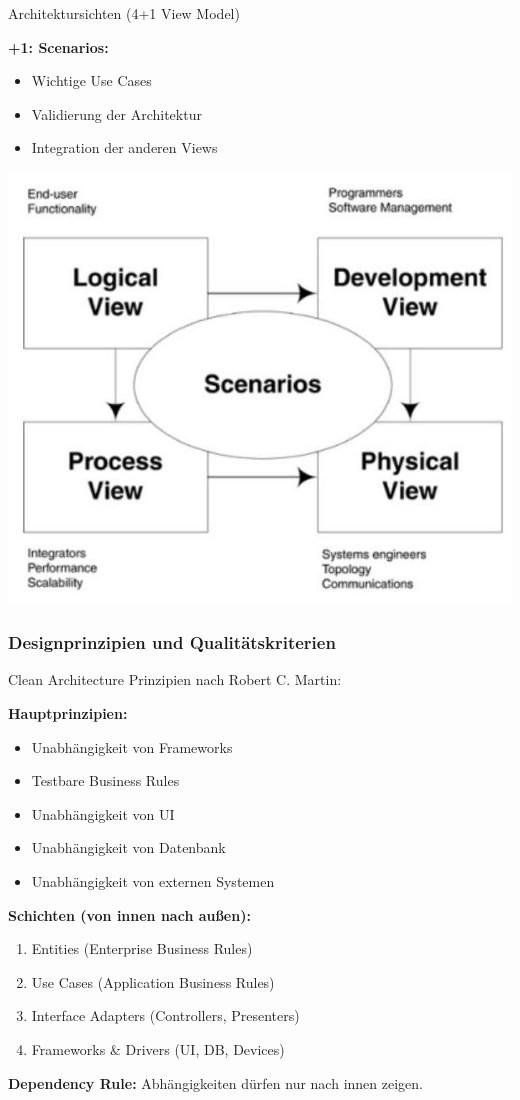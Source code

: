 \begin{concept}{Architektursichten (4+1 View Model)}
    
\textbf{+1: Scenarios:}
    \begin{itemize}
        \item Wichtige Use Cases
        \item Validierung der Architektur
        \item Integration der anderen Views
    \end{itemize}
\includegraphics[width=0.9\linewidth]{images/2024_12_29_0d1d7b5551ea1b4b41bdg-09}
\end{concept}

\subsubsection{Designprinzipien und Qualitätskriterien}

\begin{KR}{Clean Architecture}
Prinzipien nach Robert C. Martin:

\textbf{Hauptprinzipien:}
\begin{itemize}
    \item Unabhängigkeit von Frameworks
    \item Testbare Business Rules
    \item Unabhängigkeit von UI
    \item Unabhängigkeit von Datenbank
    \item Unabhängigkeit von externen Systemen
\end{itemize}

\textbf{Schichten (von innen nach außen):}
\begin{enumerate}
    \item Entities (Enterprise Business Rules)
    \item Use Cases (Application Business Rules)
    \item Interface Adapters (Controllers, Presenters)
    \item Frameworks \& Drivers (UI, DB, Devices)
\end{enumerate}

\textbf{Dependency Rule:}
Abhängigkeiten dürfen nur nach innen zeigen.
\end{KR}

